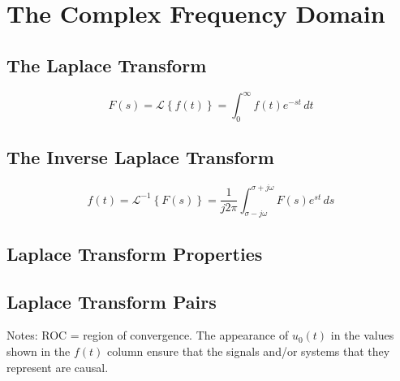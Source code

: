 

\section*{The Complex Frequency Domain}

\subsection*{The Laplace Transform}
$$
F(s)=\mathcal{L}\left\{f(t)\right\}=\int_0^{\infty} f(t)e^{-st}\, dt
$$
\subsection*{The Inverse Laplace Transform}
$$
f(t)=\mathcal{L}^{-1}\left\{F(s)\right\}=\frac{1}{j2\pi}\int_{\sigma-j\omega}^{\sigma+j\omega} F(s)e^{st}\, ds
$$
\subsection*{Laplace Transform Properties}



\subsection*{Laplace Transform Pairs}
\label{common-laplace-transform-pairs}



\noindent Notes: ROC = region of convergence. The appearance of $u_0(t)$ in the values shown in the $f(t)$
column ensure that the signals and/or systems that they represent are causal.
